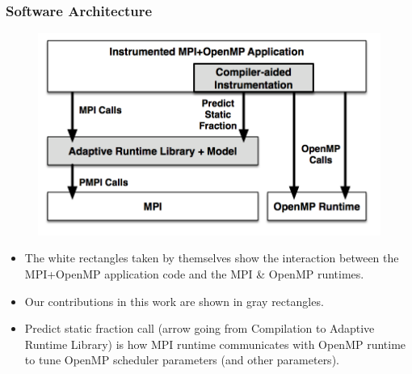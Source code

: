 {%


\begin{frame}[label=softwareArch]
\frametitle{Software Architecture}
\begin{figure}[ht!]
\begin{center}
\label{code:architecture}
\includegraphics[scale=0.56]{images/architecture.png}
\end{center}
\end{figure}
\begin{itemize}
\tiny \item \tiny The white rectangles taken by themselves show the interaction between the MPI+OpenMP application code and the
MPI \& OpenMP runtimes.
\item \tiny Our contributions in this work are shown in gray rectangles. %
\item \tiny Predict static fraction call (arrow going from Compilation to Adaptive Runtime Library) is how MPI runtime communicates with OpenMP runtime to tune OpenMP scheduler parameters (and other parameters).
\end{itemize}
\end{frame} 


}
